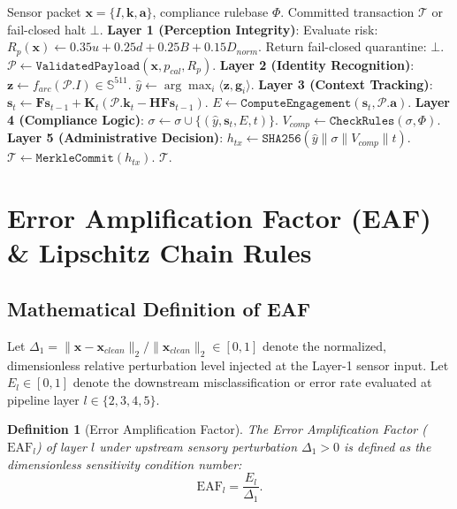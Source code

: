 \documentclass[conference]{IEEEtran}
\newtheorem{definition}{Definition}
\begin{document}
\begin{algorithm}[t]
\caption{5-Layer Macro Pipeline State Orchestration}
\label{alg:macro_orchestration}
\begin{algorithmic}[1]
\REQUIRE Sensor packet $\mathbf{x} = \{I, \mathbf{k}, \mathbf{a}\}$, compliance rulebase $\Phi$.
\ENSURE Committed transaction $\mathcal{T}$ or fail-closed halt $\bot$.
\STATE \textbf{Layer 1 (Perception Integrity)}:
\STATE Evaluate risk: $R_p(\mathbf{x}) \leftarrow 0.35u + 0.25d + 0.25B + 0.15D_{norm}$.
    \STATE Return fail-closed quarantine: $\bot$.
\ENDIF
\STATE $\mathcal{P} \leftarrow \mathtt{ValidatedPayload}(\mathbf{x}, p_{cal}, R_p)$.
\STATE \textbf{Layer 2 (Identity Recognition)}:
\STATE $\mathbf{z} \leftarrow f_{arc}(\mathcal{P}.I) \in \mathbb{S}^{511}$.
\STATE $\hat{y} \leftarrow \arg\max_{i} \langle \mathbf{z}, \mathbf{g}_i \rangle$.
\STATE \textbf{Layer 3 (Context Tracking)}:
\STATE $\mathbf{s}_t \leftarrow \mathbf{F} \mathbf{s}_{t-1} + \mathbf{K}_t (\mathcal{P}.\mathbf{k}_t - \mathbf{H} \mathbf{F} \mathbf{s}_{t-1})$.
\STATE $E \leftarrow \mathtt{ComputeEngagement}(\mathbf{s}_t, \mathcal{P}.\mathbf{a})$.
\STATE \textbf{Layer 4 (Compliance Logic)}:
\STATE $\sigma \leftarrow \sigma \cup \{(\hat{y}, \mathbf{s}_t, E, t)\}$.
\STATE $V_{comp} \leftarrow \mathtt{CheckRules}(\sigma, \Phi)$.
\STATE \textbf{Layer 5 (Administrative Decision)}:
\STATE $h_{tx} \leftarrow \mathtt{SHA256}(\hat{y} \parallel \sigma \parallel V_{comp} \parallel t)$.
\STATE $\mathcal{T} \leftarrow \mathtt{MerkleCommit}(h_{tx})$.
\RETURN $\mathcal{T}$.
\end{algorithmic}
\end{algorithm}

\section{Error Amplification Factor (EAF) \& Lipschitz Chain Rules}
\subsection{Mathematical Definition of EAF}
Let $\Delta_1 = \|\mathbf{x} - \mathbf{x}_{clean}\|_2 / \|\mathbf{x}_{clean}\|_2 \in [0, 1]$ denote the normalized, dimensionless relative perturbation level injected at the Layer-1 sensor input. Let $E_l \in [0, 1]$ denote the downstream misclassification or error rate evaluated at pipeline layer $l \in \{2, 3, 4, 5\}$.

\begin{definition}[Error Amplification Factor]
The Error Amplification Factor ($\text{EAF}_l$) of layer $l$ under upstream sensory perturbation $\Delta_1 > 0$ is defined as the dimensionless sensitivity condition number:
\begin{equation}
\mathrm{EAF}_l = \frac{E_l}{\Delta_1}.
\end{equation}
\end{definition}
\end{document}
